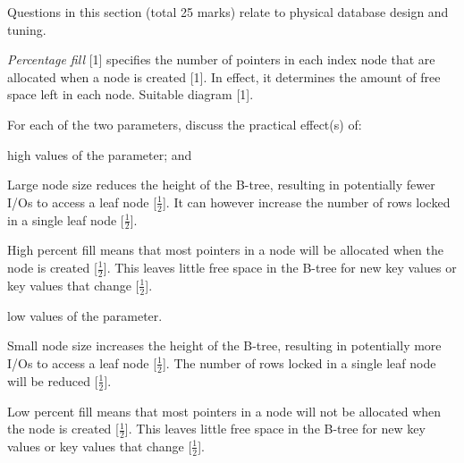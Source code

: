 \begin{examsection}{25}{}{Questions in this section (total 25 marks) relate to
physical database design and tuning.}
\begin{question}{10}
\begin{subquestion}{6}
\begin{marking}
			\emph{Percentage fill} [1] specifies the number of pointers in each
			index node that are allocated when a node is created [1]. In
			effect, it determines the amount of free space left in each node.
			Suitable diagram [1].
		\end{marking}
	\end{subquestion}
	

	\begin{subquestion}{4}
		For each of the two parameters, discuss the practical effect(s) of:
		\begin{subsubquestion}{2}
			high values of the parameter; and
			\begin{marking}
				Large node size reduces the height of the B-tree, resulting in
				potentially fewer I/Os to access a leaf node [$\frac{1}{2}$].
				It can however increase the number of rows locked in a single
				leaf node [$\frac{1}{2}$].
	
				High percent fill means that most pointers in a node will be
				allocated when the node is created [$\frac{1}{2}$]. This leaves
				little free space in the B-tree for new key values or key
				values that change [$\frac{1}{2}$].
			\end{marking}
		\end{subsubquestion}
		\begin{subsubquestion}{2}
			low values of the parameter.
			\begin{marking}
				Small node size increases the height of the B-tree, resulting
				in potentially more I/Os to access a leaf node [$\frac{1}{2}$].
				The number of rows locked in a single leaf node will be reduced
				[$\frac{1}{2}$].
	
				Low percent fill means that most pointers in a node will not be
				allocated when the node is created [$\frac{1}{2}$]. This leaves
				little free space in the B-tree for new key values or key
				values that change [$\frac{1}{2}$].
			\end{marking}
		\end{subsubquestion}
	\end{subquestion}
	

\end{question}
	


\end{examsection}
